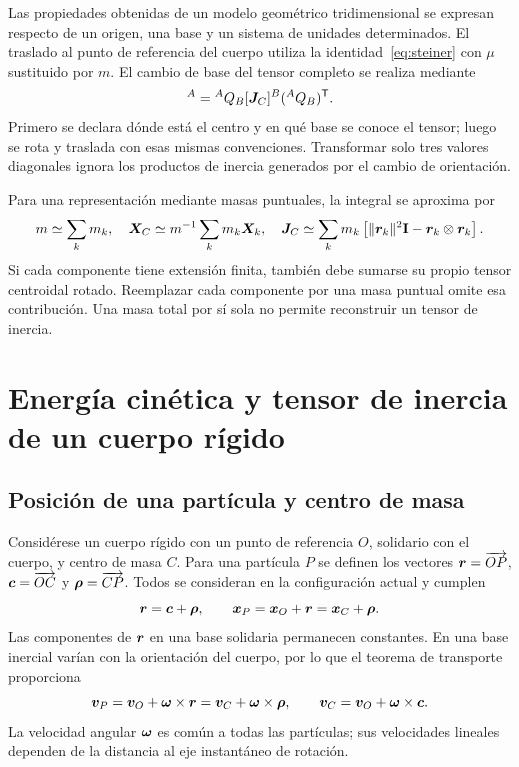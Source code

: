 Las propiedades obtenidas de un modelo geométrico tridimensional se expresan respecto de un origen, una base y un sistema de unidades determinados. El traslado al punto de referencia del cuerpo utiliza la identidad~\eqref{eq:steiner} con $\mu$ sustituido por $m$. El cambio de base del tensor completo se realiza mediante
\begin{equation}
 [\ten J_C]^A={}^A Q_B[\ten J_C]^B({}^A Q_B)^\tr.
\end{equation}
Primero se declara dónde está el centro y en qué base se conoce el tensor; luego se rota y traslada con esas mismas convenciones. Transformar solo tres valores diagonales ignora los productos de inercia generados por el cambio de orientación.

Para una representación mediante masas puntuales, la integral se aproxima por
\begin{equation}
 m\simeq\sum_k m_k,\quad
 \bm{X}_C\simeq m^{-1}\sum_k m_k\bm{X}_k,\quad
 \boldsymbol{J}_C\simeq\sum_k m_k\left[\|\bm{r}_k\|^2\mathbf I-\bm{r}_k\otimes\bm{r}_k\right].
\end{equation}
Si cada componente tiene extensión finita, también debe sumarse su propio tensor centroidal rotado. Reemplazar cada componente por una masa puntual omite esa contribución. Una masa total por sí sola no permite reconstruir un tensor de inercia.

\section{Energía cinética y tensor de inercia de un cuerpo rígido}
\subsection{Posición de una partícula y centro de masa}
Considérese un cuerpo rígido con un punto de referencia $O$, solidario con el cuerpo, y centro de masa $C$. Para una partícula $P$ se definen los vectores $\bm{r}=\overrightarrow{OP}$, $\bm{c}=\overrightarrow{OC}$ y $\bm{\rho}=\overrightarrow{CP}$. Todos se consideran en la configuración actual y cumplen
\begin{equation}
 \bm{r}=\bm{c}+\bm{\rho},\qquad
 \bm{x}_P=\bm{x}_O+\bm{r}=\bm{x}_C+\bm{\rho}.
 \label{eq:posicion-centromasa}
\end{equation}
Las componentes de $\bm{r}$ en una base solidaria permanecen constantes. En una base inercial varían con la orientación del cuerpo, por lo que el teorema de transporte proporciona
\begin{equation}
 \bm{v}_P=\bm{v}_O+\bm{\omega}\times\bm{r}
         =\bm{v}_C+\bm{\omega}\times\bm{\rho},\qquad
 \bm{v}_C=\bm{v}_O+\bm{\omega}\times\bm{c}.
 \label{eq:velocidad-rigido-centro}
\end{equation}
La velocidad angular $\bm{\omega}$ es común a todas las partículas; sus velocidades lineales dependen de la distancia al eje instantáneo de rotación.

